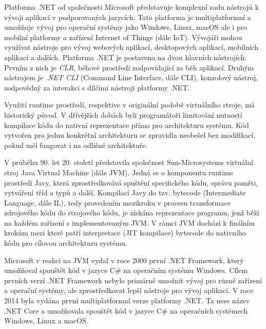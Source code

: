 

Platforma .NET od společnosti Microsoft představuje komplexní sadu nástrojů k vývoji aplikací v podporovaných jazycích. Tato platforma je multiplatformní a umožňuje vývoj pro operační systémy jako Windows, Linux, macOS ale i pro mobilní platformy a zařízení Internet of Things (dále IoT). Vývojáři mohou využívat nástroje pro vývoj webových aplikací, desktopových aplikací, mobilních aplikací a dalších. Platforma .NET je postavena na dvou hlavních nástrojích. Prvním z nich je \textit{CLR}, běhové prostředí zodpovídající za běh aplikací. Druhým nástrojem je \textit{.NET CLI} (Command Line Interface, dále CLI), konzolový nástroj, zodpovědný za interakci s dílčími nástroji platformy .NET.


Využití runtime prostředí, respektive v originální podobě virtuálního stroje, má historický původ. V dřívějších dobách byli programátoři limitování nutností kompilace kódu do nativní reprezentace přímo pro architekturu systému. Kód vytvořen pro jednu konkrétní architekturu se zpravidla neobešel bez modifikací, pokud měl fungovat i na odlišné architektuře.

V průběhu 90. let 20. století představila společnost Sun-Microsystems virtuální stroj Java Virtual Machine (dále JVM). Jedná se o komponentu runtime prostředí Javy, která zprostředkovává spuštění specifického kódu, správu paměti, vytváření tříd a typů a další. Kompilací Javy do tzv. bytecode (Intermediate Language, dále IL), tedy provedením mezikroku v procesu transformace zdrojového kódu do strojového kódu, je získána reprezentace programu, jenž běží na každém zařízení s implementovaným JVM. V rámci JVM dochází k finálním krokům mezi které patří interpretace (JIT kompilace) bytecode do nativního kódu pro cílovou architekturu systému. 

Microsoft v reakci na JVM vydal v roce 2000 první .NET Framework, který umožňoval spouštět kód v jazyce C\# na operačním systému Windows. Cílem prvních verzí .NET Framework nebylo primárně umožnit vývoj pro různé zařízení a operační systémy, ale zprostředkovat lepší nástroje pro vývoj aplikací. V roce 2014 byla vydána první multiplatformní verze platformy .NET. Ta nese název .NET Core a umožňovala spouštět kód v jazyce C\# na operačních systémech Windows, Linux a macOS. 
\cite{Richter2012}

